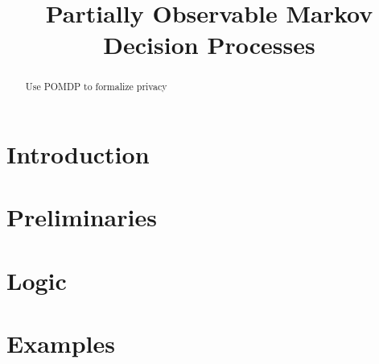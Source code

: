 \documentclass{llncs}
\title{Partially Observable Markov Decision Processes}
\begin{document}
\maketitle

\begin{abstract}
  Use POMDP to formalize privacy
\end{abstract}

\section{Introduction}
\label{section:introduction}

\section{Preliminaries}
\label{section:preliminaries}


\section{Logic}
\label{section:logic}


\section{Examples}
\label{section:examples}




\end{document}

